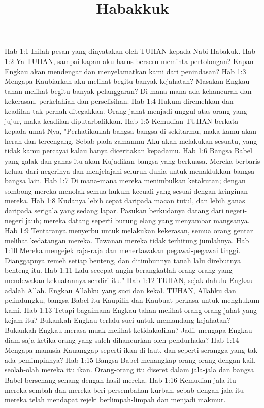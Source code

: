 

\title{Habakkuk}

Hab 1:1  Inilah pesan yang dinyatakan oleh TUHAN kepada Nabi Habakuk.
Hab 1:2  Ya TUHAN, sampai kapan aku harus berseru meminta pertolongan? Kapan Engkau akan mendengar dan menyelamatkan kami dari penindasan?
Hab 1:3  Mengapa Kaubiarkan aku melihat begitu banyak kejahatan? Masakan Engkau tahan melihat begitu banyak pelanggaran? Di mana-mana ada kehancuran dan kekerasan, perkelahian dan perselisihan.
Hab 1:4  Hukum diremehkan dan keadilan tak pernah ditegakkan. Orang jahat menjadi unggul atas orang yang jujur, maka keadilan diputarbalikkan.
Hab 1:5  Kemudian TUHAN berkata kepada umat-Nya, "Perhatikanlah bangsa-bangsa di sekitarmu, maka kamu akan heran dan tercengang. Sebab pada zamanmu Aku akan melakukan sesuatu, yang tidak kamu percayai kalau hanya diceritakan kepadamu.
Hab 1:6  Bangsa Babel yang galak dan ganas itu akan Kujadikan bangsa yang berkuasa. Mereka berbaris keluar dari negerinya dan menjelajahi seluruh dunia untuk menaklukkan bangsa-bangsa lain.
Hab 1:7  Di mana-mana mereka menimbulkan ketakutan; dengan sombong mereka menolak semua hukum kecuali yang sesuai dengan keinginan mereka.
Hab 1:8  Kudanya lebih cepat daripada macan tutul, dan lebih ganas daripada serigala yang sedang lapar. Pasukan berkudanya datang dari negeri-negeri jauh; mereka datang seperti burung elang yang menyambar mangsanya.
Hab 1:9  Tentaranya menyerbu untuk melakukan kekerasan, semua orang gentar melihat kedatangan mereka. Tawanan mereka tidak terhitung jumlahnya.
Hab 1:10  Mereka mengejek raja-raja dan menertawakan pegawai-pegawai tinggi. Dianggapnya remeh setiap benteng, dan ditimbunnya tanah lalu direbutnya benteng itu.
Hab 1:11  Lalu secepat angin berangkatlah orang-orang yang mendewakan kekuatannya sendiri itu."
Hab 1:12  TUHAN, sejak dahulu Engkau adalah Allah. Engkau Allahku yang suci dan kekal. TUHAN, Allahku dan pelindungku, bangsa Babel itu Kaupilih dan Kaubuat perkasa untuk menghukum kami.
Hab 1:13  Tetapi bagaimana Engkau tahan melihat orang-orang jahat yang kejam itu? Bukankah Engkau terlalu suci untuk memandang kejahatan? Bukankah Engkau merasa muak melihat ketidakadilan? Jadi, mengapa Engkau diam saja ketika orang yang saleh dihancurkan oleh pendurhaka?
Hab 1:14  Mengapa manusia Kauanggap seperti ikan di laut, dan seperti serangga yang tak ada pemimpinnya?
Hab 1:15  Bangsa Babel menangkap orang-orang dengan kail, seolah-olah mereka itu ikan. Orang-orang itu diseret dalam jala-jala dan bangsa Babel bersenang-senang dengan hasil mereka.
Hab 1:16  Kemudian jala itu mereka sembah dan mereka beri persembahan kurban, sebab dengan jala itu mereka telah mendapat rejeki berlimpah-limpah dan menjadi makmur.
